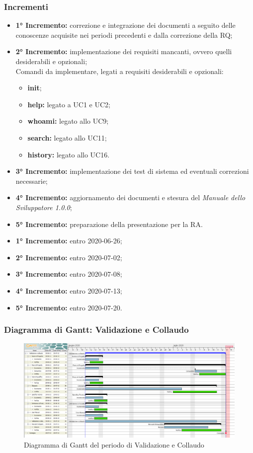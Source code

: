 	\subsubsection{Incrementi}
			\begin{itemize}
				\item \textbf{1° Incremento:} correzione e integrazione dei documenti a seguito delle conoscenze acquisite nei periodi precedenti e dalla correzione della RQ;
				\item \textbf{2° Incremento:} implementazione dei requisiti mancanti, ovvero quelli desiderabili e opzionali;\\
				Comandi da implementare, legati a requisiti desiderabili e opzionali:
					\begin{itemize}
						\item \textbf{init};
						\item \textbf{help:} legato a UC1 e UC2;
						\item \textbf{whoami:} legato allo UC9;
						\item \textbf{search:} legato allo UC11;
						\item \textbf{history:} legato allo UC16.
					\end{itemize}
				\item \textbf{3° Incremento:} implementazione dei test di sistema ed eventuali correzioni necessarie;
				\item \textbf{4° Incremento:} aggiornamento dei documenti e stesura del \textit{Manuale dello Sviluppatore 1.0.0};
				\item \textbf{5° Incremento:} preparazione della presentazione per la RA.
			\end{itemize}
			\begin{itemize}
				\item \textbf{1° Incremento:} entro 2020-06-26;
				\item \textbf{2° Incremento:} entro 2020-07-02;
				\item \textbf{3° Incremento:} entro 2020-07-08;
				\item \textbf{4° Incremento:} entro 2020-07-13;
				\item \textbf{5° Incremento:} entro 2020-07-20.
			\end{itemize}
	\subsubsection{Diagramma di Gantt: Validazione e Collaudo}
		\begin{figure}[h]
			\centering
			\includegraphics[width=1.1\textwidth]{./res/img/DiagrammiGantt/validaz_gantt.png}
			\caption{Diagramma di Gantt del periodo di Validazione e Collaudo}
		\end{figure}
